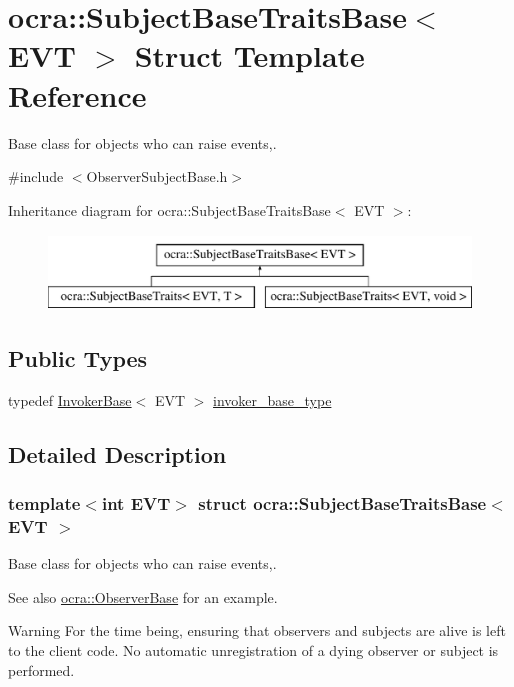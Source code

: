 \hypertarget{structocra_1_1SubjectBaseTraitsBase}{}\section{ocra\+:\+:Subject\+Base\+Traits\+Base$<$ E\+VT $>$ Struct Template Reference}
\label{structocra_1_1SubjectBaseTraitsBase}


Base class for objects who can raise events,.  




{\ttfamily \#include $<$Observer\+Subject\+Base.\+h$>$}

Inheritance diagram for ocra\+:\+:Subject\+Base\+Traits\+Base$<$ E\+VT $>$\+:\begin{figure}[H]
\begin{center}
\leavevmode
\includegraphics[height=2.000000cm]{d0/dd9/structocra_1_1SubjectBaseTraitsBase}
\end{center}
\end{figure}
\subsection*{Public Types}
\begin{DoxyCompactItemize}
\item 
typedef \hyperlink{classocra_1_1InvokerBase}{Invoker\+Base}$<$ E\+VT $>$ \hyperlink{structocra_1_1SubjectBaseTraitsBase_a439671662c8f8f3e80e6675f008dec3f}{invoker\+\_\+base\+\_\+type}
\end{DoxyCompactItemize}


\subsection{Detailed Description}
\subsubsection*{template$<$int E\+VT$>$\newline
struct ocra\+::\+Subject\+Base\+Traits\+Base$<$ E\+V\+T $>$}

Base class for objects who can raise events,. 

\begin{DoxySeeAlso}{See also}
\hyperlink{classocra_1_1ObserverBase}{ocra\+::\+Observer\+Base} for an example.
\end{DoxySeeAlso}
\begin{DoxyWarning}{Warning}
For the time being, ensuring that observers and subjects are alive is left to the client code. No automatic unregistration of a dying observer or subject is performed. 
\end{DoxyWarning}


